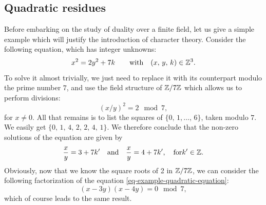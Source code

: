 \subsection{Quadratic residues}
 
  Before embarking on the study of duality over a finite field, let us give a simple example which will justify the introduction of character theory. Consider the following equation, which has integer unknowns:
\begin{equation}
\label{eq-example-quadratic-equation}
x^2 = 2 y^2 + 7 k \quad \quad \text{with} \quad (x, \, y, \, k) \in \mathbb{Z}^3.
\end{equation}
To solve it almost trivially, we just need to replace it with its counterpart modulo the prime number $ 7 $, and use the field structure of $ \mathbb{Z}/7 \mathbb{Z} $ which allows us to perform divisions:
\begin{equation*}
\left(x / y \right)^2 = 2 \mod{7},
\end{equation*}
for $ x \neq 0 $. All that remains is to list the squares of $ \{0, \, 1, \ldots, \, 6\} $, taken modulo $ 7 $. We easily get $ \{0, \, 1, \, 4, \, 2, \, 2, \, 4, \, 1\} $. We therefore conclude that the non-zero solutions of the equation are given by
\begin{equation*}
\frac{x}{y} = 3 + 7k'\quad \text{and} \quad \frac{x}{y} = 4 + 7k', \quad \text{for} k'\in \mathbb{Z}.
\end{equation*}
Obviously, now that we know the square roots of 2 in $ \mathbb{Z}/7 \mathbb{Z} $, we can consider the following factorization of the equation \eqref{eq-example-quadratic-equation}:
\begin{equation*}
(x - 3 y) (x - 4 y) = 0 \mod{7},
\end{equation*}
which of course leads to the same result.
 
